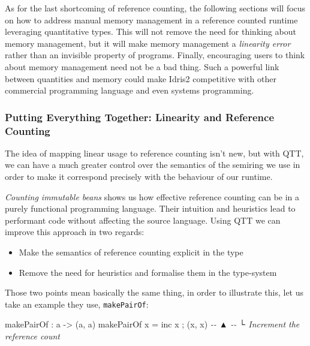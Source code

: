 \documentclass[
]{article}
\newenvironment{Shaded}{}{}
\newcommand{\CommentTok}[1]{\textcolor[rgb]{0.38,0.63,0.69}{\textit{#1}}}
\newcommand{\NormalTok}[1]{#1}
\newcommand{\OperatorTok}[1]{\textcolor[rgb]{0.40,0.40,0.40}{#1}}
\newcommand{\OtherTok}[1]{\textcolor[rgb]{0.00,0.44,0.13}{#1}}
\providecommand{\tightlist}{%
  \setlength{\itemsep}{0pt}\setlength{\parskip}{0pt}}
\begin{document}
As for the last shortcoming of reference counting, the following
sections will focus on how to address manual memory management in a
reference counted runtime leveraging quantitative types. This will not
remove the need for thinking about memory management, but it will make
memory management a \emph{linearity error} rather than an invisible
property of programs. Finally, encouraging users to think about memory
management need not be a bad thing. Such a powerful link between
quantities and memory could make Idris2 competitive with other
commercial programming language and even systems programming.

\hypertarget{putting-everything-together-linearity-and-reference-counting}{%
\subsubsection{Putting Everything Together: Linearity and Reference
Counting}\label{putting-everything-together-linearity-and-reference-counting}}

\label{subsec:linear-ref-counting}

The idea of mapping linear usage to reference counting isn't
new\cite{linear_ref_count}, but with QTT, we can have a much greater
control over the semantics of the semiring we use in order to make it
correspond precisely with the behaviour of our runtime.

\emph{Counting immutable beans}\cite{immutable_beans} shows us how
effective reference counting can be in a purely functional programming
language. Their intuition and heuristics lead to performant code without
affecting the source language. Using QTT we can improve this approach in
two regards:

\begin{itemize}
\tightlist
\item
  Make the semantics of reference counting explicit in the type
\item
  Remove the need for heuristics and formalise them in the type-system
\end{itemize}

Those two points mean basically the same thing, in order to illustrate
this, let us take an example they use, \texttt{makePairOf}:

\begin{Shaded}
\begin{Highlighting}[]
\NormalTok{makePairOf }\OperatorTok{:}\NormalTok{ a }\OtherTok{{-}\textgreater{}}\NormalTok{ (a, a)}
\NormalTok{makePairOf x }\OtherTok{=}\NormalTok{ inc x ; (x, x)}
\CommentTok{{-}{-}               ▲}
\CommentTok{{-}{-}               └ Increment the reference count}
\end{Highlighting}
\end{Shaded}
\end{document}
